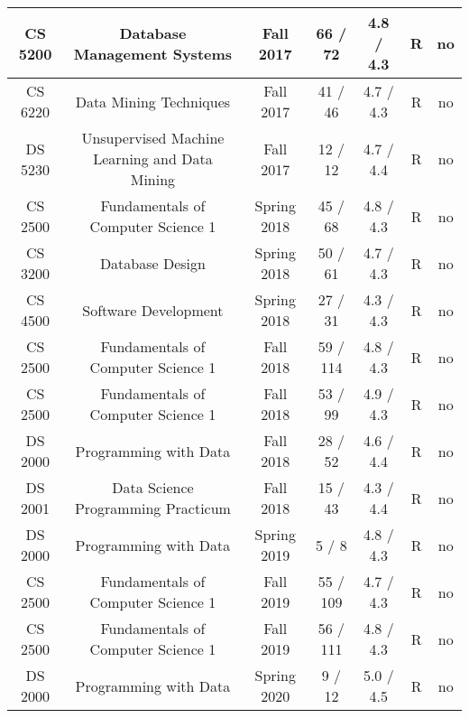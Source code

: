\begin{landscape}
\begin{center}
\begin{tabular}{ | c | c | c | c | c | c | c | }
            CS 5200 & Database Management Systems & Fall 2017 & 66 / 72 & 4.8 / 4.3 & R & no \\ \hline
            CS 6220 & Data Mining Techniques & Fall 2017 & 41 / 46 & 4.7 / 4.3 & R & no \\ \hline
            DS 5230 & Unsupervised Machine Learning and Data Mining & Fall 2017 & 12 / 12 & 4.7 / 4.4 & R & no \\ \hline
            CS 2500 & Fundamentals of Computer Science 1 & Spring 2018 & 45 / 68 & 4.8 / 4.3 & R & no \\ \hline
            CS 3200 & Database Design & Spring 2018 & 50 / 61 & 4.7 / 4.3 & R & no \\ \hline
            CS 4500 & Software Development & Spring 2018 & 27 / 31 & 4.3 / 4.3 & R & no \\ \hline
            CS 2500 & Fundamentals of Computer Science 1 & Fall 2018 & 59 / 114 & 4.8 / 4.3 & R & no \\ \hline
            CS 2500 & Fundamentals of Computer Science 1 & Fall 2018 & 53 / 99 & 4.9 / 4.3 & R & no \\ \hline
            DS 2000 & Programming with Data & Fall 2018 & 28 / 52 & 4.6 / 4.4 & R & no \\ \hline
            DS 2001 & Data Science Programming Practicum & Fall 2018 & 15 / 43 & 4.3 / 4.4 & R & no \\ \hline
            DS 2000 & Programming with Data & Spring 2019 & 5 / 8 & 4.8 / 4.3 & R & no \\ \hline
            CS 2500 & Fundamentals of Computer Science 1 & Fall 2019 & 55 / 109 & 4.7 / 4.3 & R & no \\ \hline
            CS 2500 & Fundamentals of Computer Science 1 & Fall 2019 & 56 / 111 & 4.8 / 4.3 & R & no \\ \hline
            DS 2000 & Programming with Data & Spring 2020 & 9 / 12 & 5.0 / 4.5 & R & no \\ \hline
            
        \end{tabular}

    \end{center}

\end{landscape}
